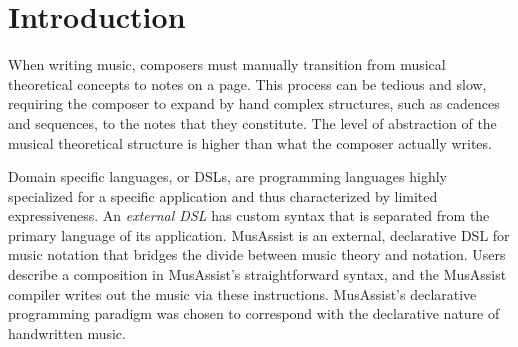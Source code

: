 \documentclass{article}
\title{\papertitle}
\begin{document}
%
\capstartfalse
\maketitle
\capstarttrue
%
\begin{abstract}
MusAssist is an external, declarative domain specific language for music notation that bridges the abstraction gap between music theory and composition. Users can describe complex musical 
templates for all triads and seventh chords, 
all diatonic as well as chromatic and whole tone scales, the five primary cadences (including imperfect authentic), 
and the four primary harmonic sequences with desired length. Uniquely, the level of abstraction of a template 
MusAssist matches that of the theoretical musical structure it describes (e.g. users can specify
 a harmonic sequence without manually lowering the granularity to chords and notes). Thus, users can write out specifications precisely at the conceptual levels of the musical theoretical structures 
 they would organically conceive when composing by hand. In MusAssist, users can also change key signatures, 
 start a new measure, and describe fundamental musical objects such as notes, rests, and chords comprised of 
 custom collections of notes. A musical expression described by a higher level template is expanded out 
 (i.e. the level of abstraction is fully lowered to notes) by the 
 Haskell-based MusAssist compiler and is finally translated to MusicXML, a language accepted by most 
 major music notation software, for further manual editing. 
\end{abstract}
%

\section{Introduction}\label{sec:introduction}
When writing music, composers must manually transition from musical theoretical concepts to notes on a page.
This process can be tedious and slow, requiring the composer to expand by hand complex structures, such as cadences and sequences,
to the notes that they constitute. The level of abstraction of the musical theoretical structure is 
higher than what the composer actually writes. 

Domain specific languages, or DSLs, 
are programming languages highly specialized for a specific application and thus characterized by limited expressiveness.
An \textit{external DSL} has custom syntax that is separated from the primary language of its application. 
MusAssist is an external, declarative DSL for music notation that bridges the divide between
music theory and notation. Users describe a composition in MusAssist's straightforward syntax, and 
the MusAssist compiler writes out the music via these instructions. MusAssist's declarative programming 
paradigm was chosen to correspond with the declarative nature of handwritten music. 
\end{document}

